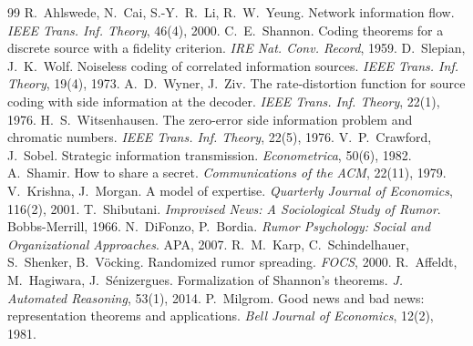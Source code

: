\documentclass[10pt,a4paper,twocolumn]{article}
\theoremstyle{plain}
\begin{document}
\begin{thebibliography}{99}
\small
\setlength{\itemsep}{1pt}
 R.~Ahlswede, N.~Cai, S.-Y.~R.~Li, R.~W.~Yeung. Network information flow. \textit{IEEE Trans. Inf. Theory}, 46(4), 2000.
 C.~E.~Shannon. Coding theorems for a discrete source with a fidelity criterion. \textit{IRE Nat. Conv. Record}, 1959.
 D.~Slepian, J.~K.~Wolf. Noiseless coding of correlated information sources. \textit{IEEE Trans. Inf. Theory}, 19(4), 1973.
 A.~D.~Wyner, J.~Ziv. The rate-distortion function for source coding with side information at the decoder. \textit{IEEE Trans. Inf. Theory}, 22(1), 1976.
 H.~S.~Witsenhausen. The zero-error side information problem and chromatic numbers. \textit{IEEE Trans. Inf. Theory}, 22(5), 1976.
 V.~P.~Crawford, J.~Sobel. Strategic information transmission. \textit{Econometrica}, 50(6), 1982.
 A.~Shamir. How to share a secret. \textit{Communications of the ACM}, 22(11), 1979.
 V.~Krishna, J.~Morgan. A model of expertise. \textit{Quarterly Journal of Economics}, 116(2), 2001.
 T.~Shibutani. \textit{Improvised News: A Sociological Study of Rumor}. Bobbs-Merrill, 1966.
 N.~DiFonzo, P.~Bordia. \textit{Rumor Psychology: Social and Organizational Approaches}. APA, 2007.
 R.~M.~Karp, C.~Schindelhauer, S.~Shenker, B.~Vöcking. Randomized rumor spreading. \textit{FOCS}, 2000.
 R.~Affeldt, M.~Hagiwara, J.~Sénizergues. Formalization of Shannon's theorems. \textit{J. Automated Reasoning}, 53(1), 2014.
 P.~Milgrom. Good news and bad news: representation theorems and applications. \textit{Bell Journal of Economics}, 12(2), 1981.
\end{thebibliography}
\end{document}
